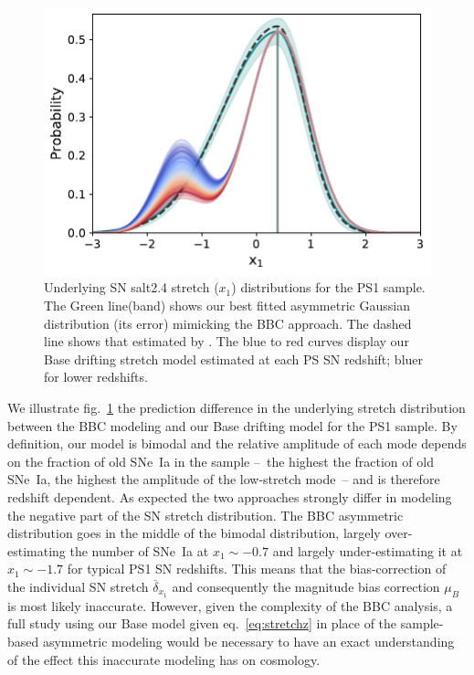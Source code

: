 \documentclass[]{aa} %
\newcommand{\mr}[1]{{\textcolor[rgb]{0.60,0.10,0.6}{#1}}}
\begin{document}
\begin{figure}
    \centering
    \includegraphics[width=\linewidth]{Article_figures/bbc_comp_PS1.pdf}
    \caption{Underlying SN salt2.4 stretch ($x_1$) distributions for the PS1
    sample. The Green line(band) shows our best fitted asymmetric Gaussian
distribution (its error) mimicking the BBC approach. The dashed line shows that
estimated by \cite{scolnic2018a}. The blue to red curves display our Base
drifting stretch model estimated at each PS SN redshift; bluer for lower
redshifts.}
    \label{fig:bbc_pdf_ps1}
\end{figure}

\mr{We illustrate fig.~\ref{fig:bbc_pdf_ps1} the prediction difference in the
underlying stretch distribution between the BBC modeling and our Base drifting
model for the PS1 sample. By definition, our model is bimodal and the relative
amplitude of each mode depends on the fraction of old SNe~Ia in the sample
--~the highest the fraction of old SNe~Ia, the highest the amplitude of the
low-stretch mode~-- and is therefore redshift dependent.  As expected the two
approaches strongly differ in modeling the negative part of the SN stretch
distribution. The BBC asymmetric distribution goes in the middle of the bimodal
distribution, largely over-estimating the number of SNe~Ia at $x_1\sim-0.7$ and
largely under-estimating it at $x_1\sim-1.7$ for typical PS1 SN redshifts. This
means that the bias-correction of the individual SN stretch
$\overline{\delta}_{x_1}$ \citep{kessler2017} and consequently the magnitude
bias correction $\mu_B$ is most likely inaccurate. However, given the complexity
of the BBC analysis, a full study using our Base model given
eq.~\ref{eq:stretchz} in place of the sample-based asymmetric modeling would be
necessary to have an exact understanding of the effect this inaccurate modeling
has on cosmology.}
\end{document}
